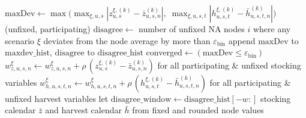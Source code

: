 \documentclass[12pt,a4paper]{article}
\begin{document}
\begin{algorithm}[htbp]
\caption{Phase 1 --- B-PHA main loop (Part~2: continuation of Algorithm~\ref{alg:phase1})}
\label{alg:phase1b}
\BlankLine
{}
\BlankLine
  $\mathrm{maxDev}\leftarrow\max\bigl(
    \max_{\xi,u,s}|z^{\xi,(k)}_{u,s}-\bar{z}^{(k)}_{u,s,n}|,\;
    \max_{\xi,u,s,t}|h^{\xi,(k)}_{u,s,t}-\bar{h}^{(k)}_{u,s,t,n}|
  \bigr)$ (unfixed, participating)\;
  $\mathrm{disagree}\leftarrow$ number of unfixed NA nodes $i$ where
    any scenario $\xi$ deviates from the node average by more than $\varepsilon_{\mathrm{bin}}$\;
  append $\mathrm{maxDev}$ to $\mathrm{maxdev\_hist}$, $\mathrm{disagree}$ to $\mathrm{disagree\_hist}$\;
  converged$\leftarrow(\mathrm{maxDev}\leq\varepsilon_{\mathrm{bin}})$\;
  \BlankLine
  \BlankLine
  $w^{\xi}_{z,u,s,n}\leftarrow w^{\xi}_{z,u,s,n}
    +\rho\,(z^{\xi,(k)}_{u,s}-\bar{z}^{(k)}_{u,s,n})$\quad
  for all participating \& unfixed stocking variables\:
  $w^{\xi}_{h,u,s,t,n}\leftarrow w^{\xi}_{h,u,s,t,n}
    +\rho\,(h^{\xi,(k)}_{u,s,t}-\bar{h}^{(k)}_{u,s,t,n})$\quad
  for all participating \& unfixed harvest variables\:
  \BlankLine
  let $\mathrm{disagree\_window} \leftarrow \mathrm{disagree\_hist}[-w:]$\;
\BlankLine
\Return stocking calendar $\bar{z}$ and harvest calendar $\bar{h}$
from fixed and rounded node values\;
\end{algorithm}
\end{document}
